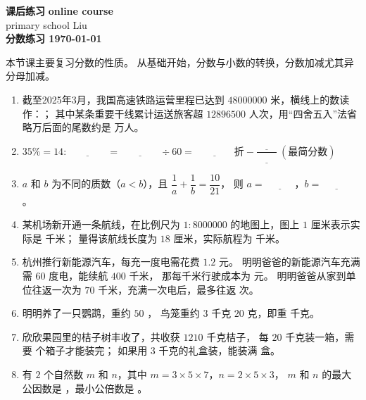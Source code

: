 \documentclass[DIN, pagenumber=false, fontsize=11pt, parskip=half]{scrartcl}
\newcommand{\mytitle}[1]{{\noindent\Large\textbf{#1}}}
\begin{document}
\newcommand{\blank}[1][3em]{\underline{\hspace{#1}}}
\noindent\textbf{课后练习} \hfill \textbf{online course}\\
primary school \hfill Liu\\

\mytitle{分数练习 \hfill \today}
\newline
\begin{parchmentquote}
    本节课主要复习分数的性质。
    从基础开始，分数与小数的转换，分数加减尤其异分母加减。


\end{parchmentquote}

\begin{enumerate}
  \item 截至2025年3月，我国高速铁路运营里程已达到 $48000000$ 米，横线上的数读作：\blank[6em]；
  其中某条重要干线累计运送旅客超 $12896500$ 人次，用“四舍五入”法省略万后面的尾数约是 \blank[4em] 万人。

  \item $35\%=14:\blank[4em]=\blank[4em]\div 60=\blank[4em]\text{折}-\dfrac{\blank[2em]}{\blank[2em]}\ (\text{最简分数})$

  \item $a$ 和 $b$ 为不同的质数（$a<b$），且
  $\dfrac{1}{a}+\dfrac{1}{b}=\dfrac{10}{21}$，
  则 $a=\blank[3em]$，$b=\blank[3em]$。

  \item 某机场新开通一条航线，在比例尺为 $1:8000000$ 的地图上，图上 $1$ 厘米表示实际是 \blank[3em] 千米；
  量得该航线长度为 $18$ 厘米，实际航程为 \blank[3em] 千米。

  \item 杭州推行新能源汽车，每充一度电需花费 $1.2$ 元。
  明明爸爸的新能源汽车充满需 $60$ 度电，能续航 $400$ 千米，
  那每千米行驶成本为 \blank[3em] 元。
  明明爸爸从家到单位往返一次为 $70$ 千米，充满一次电后，最多往返 \blank[3em] 次。

  \item 明明养了一只鹦鹉，重约 $50$ \blank[2em]，
  鸟笼重约 $3$ 千克 $20$ 克，即重 \blank[3em] 千克。

  \item 欣欣果园里的桔子树丰收了，共收获 $1210$ 千克桔子，
  每 $20$ 千克装一箱，需要 \blank[3em] 个箱子才能装完；
  如果用 $3$ 千克的礼盒装，能装满 \blank[3em] 盒。

  \item 有 $2$ 个自然数 $m$ 和 $n$，其中 $m=3\times5\times7$，$n=2\times5\times3$，
  $m$ 和 $n$ 的最大公因数是 \blank[4em]，最小公倍数是 \blank[4em]。


\end{enumerate}
\end{document}
